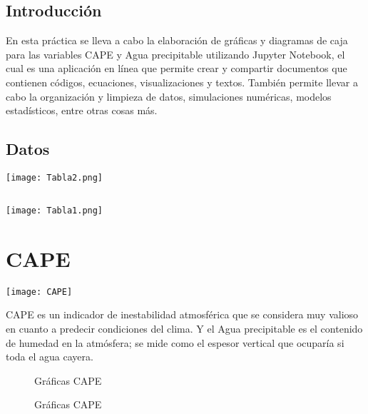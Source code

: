 \documentclass[12pt]{article}
\begin{document}
\begin{centering}
\section*{Introducción}
\end{centering}
En esta práctica se lleva a cabo la elaboración de gráficas y diagramas de caja para las variables CAPE y Agua precipitable utilizando Jupyter Notebook, el cual es una aplicación en línea que permite crear y compartir documentos que contienen códigos, ecuaciones, visualizaciones y textos. También permite llevar a cabo la organización y limpieza de datos, simulaciones numéricas, modelos estadísticos, entre otras cosas más.\\

\begin{centering}
\section{Datos}
\texttt{[image: Tabla2.png]}

\subsection{}
\begin{centering}
\texttt{[image: Tabla1.png]}
\end{centering}
\end{centering}



\newpage
\section{CAPE}
\begin{center}
\texttt{[image: CAPE]}
\end{center}
CAPE es un indicador de inestabilidad atmosférica que se considera muy valioso en cuanto a predecir condiciones del clima. Y el Agua precipitable es el contenido de humedad en la atmósfera; se mide como el espesor vertical que ocuparía si toda el agua cayera. 
\vspace{1cm}
\begin{figure}[H]
 \centering
    \caption{Gráficas CAPE}
\end{figure}
\begin{figure}[H]
 \centering
    \caption{Gráficas CAPE}
\end{figure}
\end{document}
